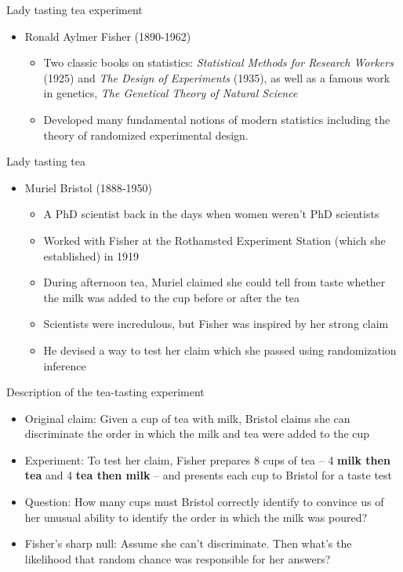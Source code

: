\documentclass{beamer}
\begin{document}
\begin{frame}{Lady tasting tea experiment}

	\begin{itemize}
	\item Ronald Aylmer Fisher (1890-1962)
		\begin{itemize}
		\item Two classic books on statistics: \emph{Statistical Methods for Research Workers} (1925) and \emph{The Design of Experiments} (1935), as well as a famous work in genetics, \emph{The Genetical Theory of Natural Science}
		\item Developed many fundamental notions of modern statistics including the theory of randomized experimental design.
		\end{itemize}

	\end{itemize}
	
\end{frame}


\begin{frame}{Lady tasting tea}

\begin{itemize}
	\item Muriel Bristol (1888-1950)
		\begin{itemize}
		\item A PhD scientist back in the days when women weren't PhD scientists
		\item Worked with Fisher at the Rothamsted Experiment Station (which she established) in 1919 
		\item During afternoon tea, Muriel claimed she could tell from taste whether the milk was added to the cup before or after the tea
		\item Scientists were incredulous, but Fisher was inspired by her strong claim
		\item He devised a way to test her claim which she passed using randomization inference
		\end{itemize}
\end{itemize}

\end{frame}

\begin{frame}{Description of the tea-tasting experiment}

	\begin{itemize}
	\item Original claim: Given a cup of tea with milk, Bristol claims she can discriminate the order in which the milk and tea were added to the cup
	\item Experiment: To test her claim, Fisher prepares 8 cups of tea -- 4 \textbf{milk then tea} and 4 \textbf{tea then milk} -- and presents each cup to Bristol for a taste test
	\item Question: How many cups must Bristol correctly identify to convince us of her unusual ability to identify the order in which the milk was poured?
	\item Fisher's sharp null: Assume she can't discriminate.  Then what's the likelihood that random chance was responsible for her answers?
	\end{itemize}
\end{frame}
\end{document}
